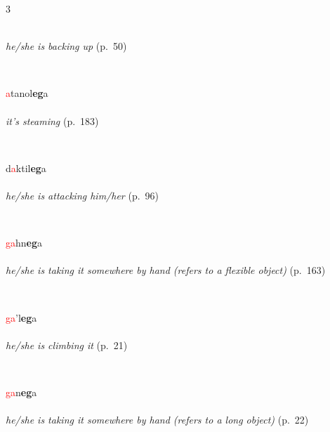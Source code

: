 \documentclass[oneside,openany]{book}%
\begin{document}
\begin{multicols}{3}
\begin{minipage}[t]{\linewidth}
\\
\noindent \textit{he/she is backing up} (p.~50)
\end{minipage}\\[1em]%
\begin{minipage}[t]{\linewidth}
\raggedright\noindent \textcolor{Red}{a}tanol\textbf{eg}a\\
\\
\noindent \textit{it's steaming} (p.~183)
\end{minipage}\\[1em]%
\begin{minipage}[t]{\linewidth}
\raggedright\noindent d\textcolor{Red}{a}ktil\textbf{eg}a\\
\\
\noindent \textit{he/she is attacking him/her} (p.~96)
\end{minipage}\\[1em]%
\begin{minipage}[t]{\linewidth}
\raggedright\noindent \textcolor{Red}{ga}hn\textbf{eg}a\\
\\
\noindent \textit{he/she is taking it somewhere by hand (refers to a flexible object)} (p.~163)
\end{minipage}\\[1em]%
\begin{minipage}[t]{\linewidth}
\raggedright\noindent \textcolor{Red}{ga}'l\textbf{eg}a\\
\\
\noindent \textit{he/she is climbing it} (p.~21)
\end{minipage}\\[1em]%
\begin{minipage}[t]{\linewidth}
\raggedright\noindent \textcolor{Red}{ga}n\textbf{eg}a\\
\\
\noindent \textit{he/she is taking it somewhere by hand (refers to a long object)} (p.~22)
\end{minipage}\\[1em]%
\begin{minipage}[t]{\linewidth}

\end{minipage}
\end{multicols}
\end{document}
